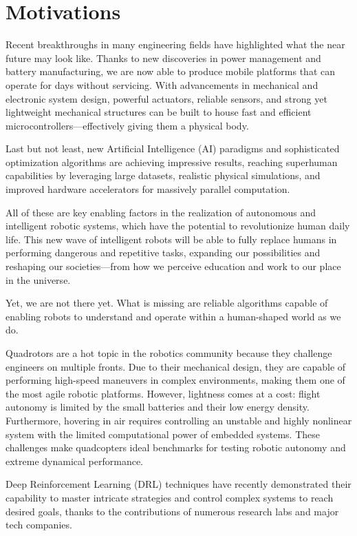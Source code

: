 \documentclass[a4paper,oneside]{book}
\theoremstyle{definition}
\begin{document}
\section*{Motivations}
Recent breakthroughs in many engineering fields have highlighted what the near future may look like. Thanks to new discoveries in power management and battery manufacturing, we are now able to produce mobile platforms that can operate for days without servicing. With advancements in mechanical and electronic system design, powerful actuators, reliable sensors, and strong yet lightweight mechanical structures can be built to house fast and efficient microcontrollers—effectively giving them a physical body.

Last but not least, new Artificial Intelligence (AI) paradigms and sophisticated optimization algorithms are achieving impressive results, reaching superhuman capabilities by leveraging large datasets, realistic physical simulations, and improved hardware accelerators for massively parallel computation.

All of these are key enabling factors in the realization of autonomous and intelligent robotic systems, which have the potential to revolutionize human daily life. This new wave of intelligent robots will be able to fully replace humans in performing dangerous and repetitive tasks, expanding our possibilities and reshaping our societies—from how we perceive education and work to our place in the universe.

Yet, we are not there yet. What is missing are reliable algorithms capable of enabling robots to understand and operate within a human-shaped world as we do.

Quadrotors are a hot topic in the robotics community because they challenge engineers on multiple fronts. Due to their mechanical design, they are capable of performing high-speed maneuvers in complex environments, making them one of the most agile robotic platforms. However, lightness comes at a cost: flight autonomy is limited by the small batteries and their low energy density. Furthermore, hovering in air requires controlling an unstable and highly nonlinear system with the limited computational power of embedded systems. These challenges make quadcopters ideal benchmarks for testing robotic autonomy and extreme dynamical performance.

Deep Reinforcement Learning (DRL) techniques have recently demonstrated their capability to master intricate strategies and control complex systems to reach desired goals, thanks to the contributions of numerous research labs and major tech companies.
\end{document}

